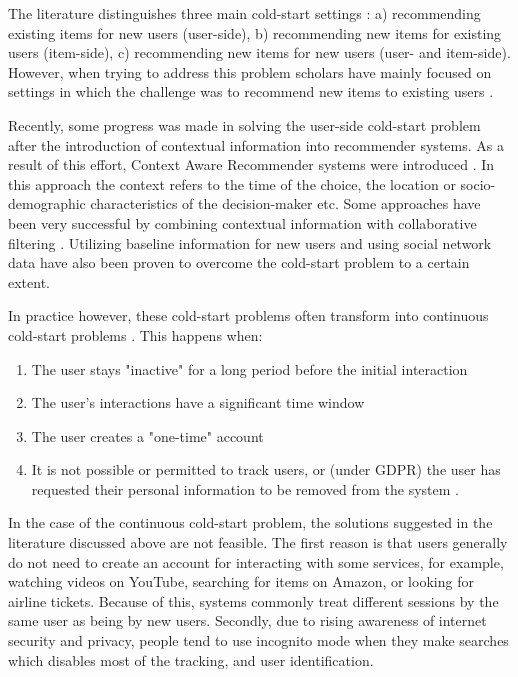 \documentclass[a4paper,12pt]{article}
\begin{document}
The literature distinguishes three main cold-start settings \citep{park2009pairwise}: a) recommending existing items for new users (user-side), b) recommending new items for existing users (item-side), c) recommending new items for new users (user- and item-side). However, when trying to address this problem scholars have mainly focused on settings in which the challenge was to recommend new items to existing users \citep{zhang2010solving}.

Recently, some progress was made in solving the user-side cold-start problem after the introduction of contextual information into recommender systems. As a result of this effort, Context Aware Recommender systems were introduced \citep{adomavicius2011context}. In this approach the context refers to the time of the choice, the location or socio-demographic characteristics of the decision-maker etc.  Some approaches have been very successful by combining contextual information with collaborative filtering \citep{aharon2013off,bykau2013coping,saveski2014item}. Utilizing baseline information for new users \citep{kluver2014evaluating} and using social network data \citep{guy2009personalized} have also been proven to overcome the cold-start problem to a certain extent.

In practice however, these cold-start problems often transform into continuous cold-start problems \citep{kiseleva2016beyond}. This happens when:
\begin{enumerate}
    \item The user stays "inactive" for a long period before the initial interaction
    \item The user's interactions have a significant time window
    \item The user creates a "one-time" account
    \item It is not possible or permitted to track users, or (under GDPR) the user has requested their personal information to be removed from the system \citep{hildebrandt2022issue}.
\end{enumerate}

In the case of the continuous cold-start problem, the solutions suggested in the literature discussed above are not feasible. The first reason is that users generally do not need to create an account for interacting with some services, for example,  watching videos on YouTube, searching for items on Amazon, or looking for airline tickets. Because of this, systems commonly treat different sessions by the same user as being by new users. Secondly, due to rising awareness of internet security and privacy, people tend to use incognito mode when they make searches \citep{anton2010internet} which disables most of the tracking, and user identification.
\end{document}
